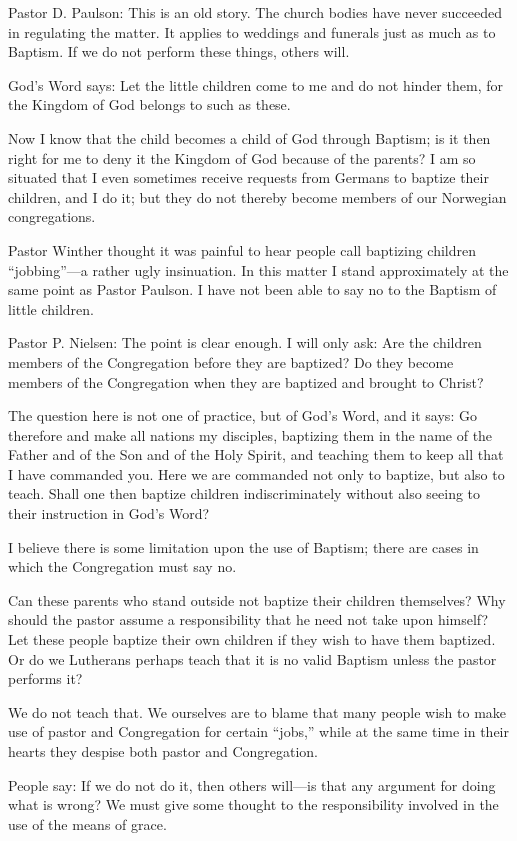 Pastor D. Paulson: This is an old story. The church bodies have never succeeded in regulating the matter. It applies to weddings and funerals just as much as to Baptism. If we do not perform these things, others will.

God’s Word says: Let the little children come to me and do not hinder them, for the Kingdom of God belongs to such as these.

Now I know that the child becomes a child of God through Baptism; is it then right for me to deny it the Kingdom of God because of the parents? I am so situated that I even sometimes receive requests from Germans to baptize their children, and I do it; but they do not thereby become members of our Norwegian congregations.

Pastor Winther thought it was painful to hear people call baptizing children “jobbing”—a rather ugly insinuation. In this matter I stand approximately at the same point as Pastor Paulson. I have not been able to say no to the Baptism of little children.

Pastor P. Nielsen: The point is clear enough. I will only ask: Are the children members of the Congregation before they are baptized? Do they become members of the Congregation when they are baptized and brought to Christ?

The question here is not one of practice, but of God’s Word, and it says: Go therefore and make all nations my disciples, baptizing them in the name of the Father and of the Son and of the Holy Spirit, and teaching them to keep all that I have commanded you. Here we are commanded not only to baptize, but also to teach. Shall one then baptize children indiscriminately without also seeing to their instruction in God’s Word?

I believe there is some limitation upon the use of Baptism; there are cases in which the Congregation must say no.

Can these parents who stand outside not baptize their children themselves? Why should the pastor assume a responsibility that he need not take upon himself? Let these people baptize their own children if they wish to have them baptized. Or do we Lutherans perhaps teach that it is no valid Baptism unless the pastor performs it?

We do not teach that. We ourselves are to blame that many people wish to make use of pastor and Congregation for certain “jobs,” while at the same time in their hearts they despise both pastor and Congregation.

People say: If we do not do it, then others will—is that any argument for doing what is wrong? We must give some thought to the responsibility involved in the use of the means of grace.

